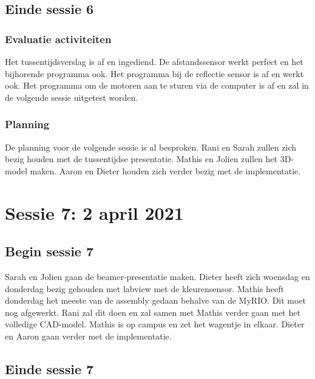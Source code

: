 \documentclass[a4paper,twoside,kulak]{kulakreport} %
\begin{document}
\section{Einde sessie 6}
\subsection{Evaluatie activiteiten}
Het tussentijdsverslag is af en ingediend. De afstandssensor werkt perfect en het bijhorende programma ook. Het programma bij de reflectie sensor is af en werkt ook. Het programma om de motoren aan te sturen via de computer is af en zal in de volgende sessie uitgetest worden.
\subsection{Planning}
De planning voor de volgende sessie is al besproken. Rani en Sarah zullen zich bezig houden met de tussentijdse presentatie. Mathis en Jolien zullen het 3D-model maken. Aaron en Dieter houden zich verder bezig met de implementatie.

\chapter{Sessie 7: 2 april 2021}
\section{Begin sessie 7}
Sarah en Jolien gaan de beamer-presentatie maken. 
Dieter heeft zich woensdag en donderdag bezig gehouden met labview met de kleurensensor. Mathis heeft donderdag het meeste van de assembly gedaan behalve van de MyRIO. Dit moet nog afgewerkt. Rani zal dit doen en zal samen met Mathis verder gaan met het volledige CAD-model. Mathis is op campus en zet het wagentje in elkaar. Dieter en Aaron gaan verder met de implementatie.
\section{Einde sessie 7}
\end{document}
